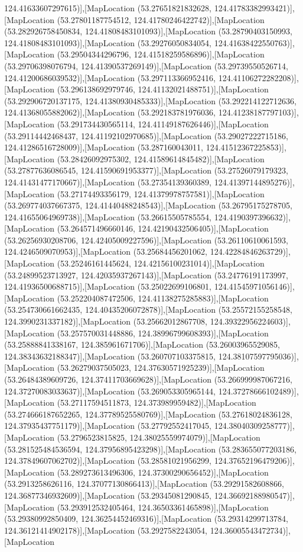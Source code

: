 124.41633607297615)],[MapLocation (53.27651821832628, 124.41783382993421)],[MapLocation (53.27801187754512, 124.41780246422742)],[MapLocation (53.282926758450834, 124.41808483101093)],[MapLocation (53.28790403150993, 124.41808483101093)],[MapLocation (53.29276050834054, 124.41638422550763)],[MapLocation (53.29504344296796, 124.41518259586896)],[MapLocation (53.29706398076794, 124.41390537269149)],[MapLocation (53.29739550526714, 124.41200686039532)],[MapLocation (53.297113366952416, 124.41106272282208)],[MapLocation (53.296138692979746, 124.41132021488751)],[MapLocation (53.292906720137175, 124.41380930485333)],[MapLocation (53.292214122712636, 124.41368055882062)],[MapLocation (53.292183781976036, 124.41238187797103)],[MapLocation (53.291734430565114, 124.41149187626446)],[MapLocation (53.29114442468437, 124.41192102970685)],[MapLocation (53.29027222715186, 124.41286516728009)],[MapLocation (53.287160043011, 124.41512367225853)],[MapLocation (53.28426092975302, 124.41589614845482)],[MapLocation (53.27877636086545, 124.41590691953377)],[MapLocation (53.27526079179323, 124.41431477170667)],[MapLocation (53.27354139360389, 124.41397144895276)],[MapLocation (53.27174493356179, 124.41379978757581)],[MapLocation (53.269774037667375, 124.41440488248543)],[MapLocation (53.26795175278705, 124.41655064969738)],[MapLocation (53.26615505785554, 124.4190397396632)],[MapLocation (53.264571496660146, 124.42190432506405)],[MapLocation (53.26256930208706, 124.42405009227596)],[MapLocation (53.26110610061593, 124.4246509070953)],[MapLocation (53.25684456201062, 124.42284846263729)],[MapLocation (53.25246161445624, 124.42156100231014)],[MapLocation (53.24899523713927, 124.42035937267143)],[MapLocation (53.24776191173997, 124.41936500688715)],[MapLocation (53.25022699106801, 124.41545971056146)],[MapLocation (53.252204087472506, 124.41138275285883)],[MapLocation (53.254730661662435, 124.40435206072878)],[MapLocation (53.25572155258548, 124.3990231337182)],[MapLocation (53.25662012867708, 124.39322956224603)],[MapLocation (53.257570031448886, 124.38996799608393)],[MapLocation (53.25888841338167, 124.385961671706)],[MapLocation (53.26003965529085, 124.38343632188347)],[MapLocation (53.260707103375815, 124.38107597795036)],[MapLocation (53.26279037505023, 124.37630571925239)],[MapLocation (53.26484389609726, 124.37411703669628)],[MapLocation (53.266999987067216, 124.37270083033637)],[MapLocation (53.269053305965144, 124.37278666102489)],[MapLocation (53.27117594511873, 124.373989959482)],[MapLocation (53.274666187652265, 124.37789525580769)],[MapLocation (53.27618024836128, 124.37935437751179)],[MapLocation (53.27792552417045, 124.38040309258777)],[MapLocation (53.2796523815825, 124.38025559974079)],[MapLocation (53.281525484536594, 124.37956895423298)],[MapLocation (53.283655077203186, 124.37849607062702)],[MapLocation (53.28581021956299, 124.37652196479206)],[MapLocation (53.289273613496306, 124.37300290656452)],[MapLocation (53.2913258626116, 124.37077130866413)],[MapLocation (53.29291582608866, 124.36877346932609)],[MapLocation (53.29345081290845, 124.36692188980547)],[MapLocation (53.293912532405464, 124.36503361465898)],[MapLocation (53.29380992850409, 124.36254452469316)],[MapLocation (53.29314299713784, 124.36121414902178)],[MapLocation (53.2927582243054, 124.36005543472734)],[MapLocation 